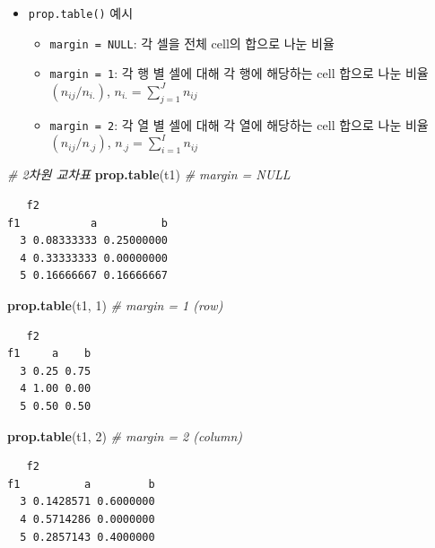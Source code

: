 \documentclass[
  11pt,
]{krantz}
\newenvironment{Shaded}{\begin{snugshade}}{\end{snugshade}}
\newcommand{\CommentTok}[1]{\textcolor[rgb]{0.37,0.37,0.37}{\textit{#1}}}
\newcommand{\DecValTok}[1]{\textcolor[rgb]{0.06,0.06,0.06}{#1}}
\newcommand{\KeywordTok}[1]{\textcolor[rgb]{0.27,0.27,0.27}{\textbf{#1}}}
\newcommand{\NormalTok}[1]{#1}
\providecommand{\tightlist}{%
  \setlength{\itemsep}{0pt}\setlength{\parskip}{0pt}}
\begin{document}
\normalsize

\begin{itemize}
\tightlist
\item
  \texttt{prop.table()} 예시

  \begin{itemize}
  \tightlist
  \item
    \texttt{margin\ =\ NULL}: 각 셀을 전체 cell의 합으로 나눈 비율
  \item
    \texttt{margin\ =\ 1}: 각 행 별 셀에 대해 각 행에 해당하는 cell 합으로 나눈 비율 \((n_{ij}/n_{i.})\), \(n_{i.} = \sum_{j=1}^{J} n_{ij}\)
  \item
    \texttt{margin\ =\ 2}: 각 열 별 셀에 대해 각 열에 해당하는 cell 합으로 나눈 비율 \((n_{ij}/n_{.j})\), \(n_{.j} = \sum_{i=1}^{I} n_{ij}\)
  \end{itemize}
\end{itemize}

\footnotesize

\begin{Shaded}
\begin{Highlighting}[]
\CommentTok{# 2차원 교차표}
\KeywordTok{prop.table}\NormalTok{(t1) }\CommentTok{# margin = NULL}
\end{Highlighting}
\end{Shaded}

\begin{verbatim}
   f2
f1           a          b
  3 0.08333333 0.25000000
  4 0.33333333 0.00000000
  5 0.16666667 0.16666667
\end{verbatim}

\begin{Shaded}
\begin{Highlighting}[]
\KeywordTok{prop.table}\NormalTok{(t1, }\DecValTok{1}\NormalTok{) }\CommentTok{# margin = 1 (row)}
\end{Highlighting}
\end{Shaded}

\begin{verbatim}
   f2
f1     a    b
  3 0.25 0.75
  4 1.00 0.00
  5 0.50 0.50
\end{verbatim}

\begin{Shaded}
\begin{Highlighting}[]
\KeywordTok{prop.table}\NormalTok{(t1, }\DecValTok{2}\NormalTok{) }\CommentTok{# margin = 2 (column)}
\end{Highlighting}
\end{Shaded}

\begin{verbatim}
   f2
f1          a         b
  3 0.1428571 0.6000000
  4 0.5714286 0.0000000
  5 0.2857143 0.4000000
\end{verbatim}
\end{document}
